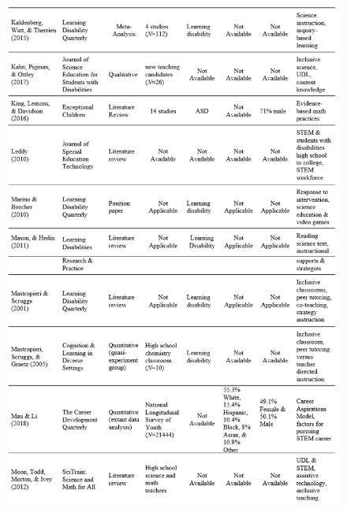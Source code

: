 \documentclass[11pt]{sig-alternate}
\begin{document}
\begin{large}
\begin{figure}[htp]
    \includegraphics[width=14cm]{Table1c2.png}
\end{figure}
\newpage
\newpage
\newpage
\pagebreak
\clearpage
\begin{figure}[htp]


\end{figure}
\end{large}
\end{document}
